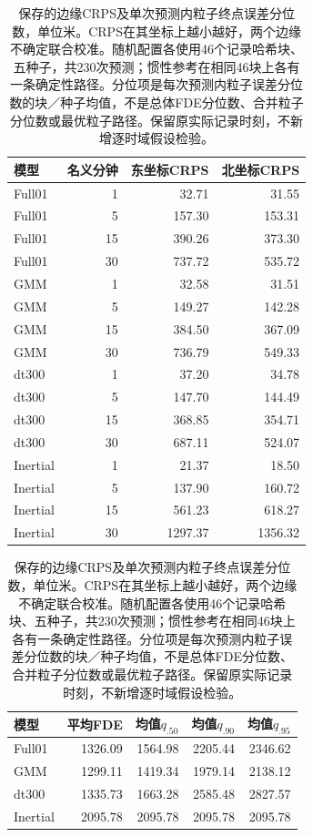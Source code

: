 \begin{table}[htbp]
\centering\small
\caption{保存的边缘CRPS及单次预测内粒子终点误差分位数，单位米。CRPS在其坐标上越小越好，两个边缘不确定联合校准。随机配置各使用46个记录哈希块、五种子，共230次预测；惯性参考在相同46块上各有一条确定性路径。分位项是每次预测内粒子误差分位数的块／种子均值，不是总体FDE分位数、合并粒子分位数或最优粒子路径。保留原实际记录时刻，不新增逐时域假设检验。}
\label{tab:crps-endpoint-diagnostics}
\begin{tabular}{@{}lrrr@{}}
\toprule
模型 & 名义分钟 & 东坐标CRPS & 北坐标CRPS\\
\midrule
Full01 & 1 & 32.71 & 31.55\\
Full01 & 5 & 157.30 & 153.31\\
Full01 & 15 & 390.26 & 373.30\\
Full01 & 30 & 737.72 & 535.72\\
GMM & 1 & 32.58 & 31.51\\
GMM & 5 & 149.27 & 142.28\\
GMM & 15 & 384.50 & 367.09\\
GMM & 30 & 736.79 & 549.33\\
dt300 & 1 & 37.20 & 34.78\\
dt300 & 5 & 147.70 & 144.49\\
dt300 & 15 & 368.85 & 354.71\\
dt300 & 30 & 687.11 & 524.07\\
Inertial & 1 & 21.37 & 18.50\\
Inertial & 5 & 137.90 & 160.72\\
Inertial & 15 & 561.23 & 618.27\\
Inertial & 30 & 1297.37 & 1356.32\\
\bottomrule
\end{tabular}
\par\medskip
\begin{tabular}{@{}lrrrr@{}}
\toprule
模型 & 平均FDE & 均值$q_{.50}$ & 均值$q_{.90}$ & 均值$q_{.95}$\\
\midrule
Full01 & 1326.09 & 1564.98 & 2205.44 & 2346.62\\
GMM & 1299.11 & 1419.34 & 1979.14 & 2138.12\\
dt300 & 1335.73 & 1663.28 & 2585.48 & 2827.57\\
Inertial & 2095.78 & 2095.78 & 2095.78 & 2095.78\\
\bottomrule
\end{tabular}
\end{table}
